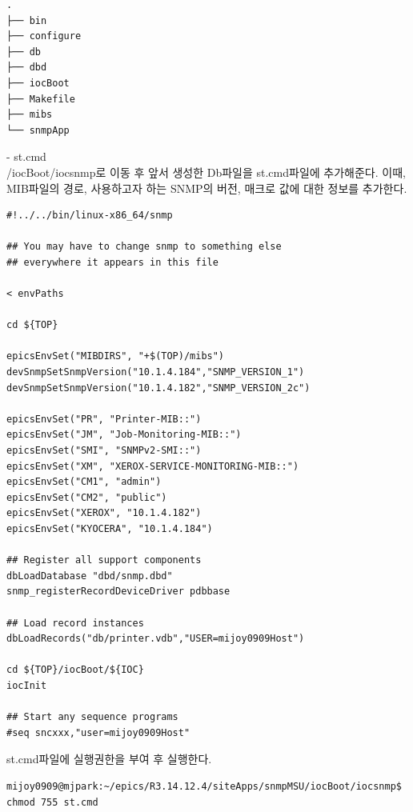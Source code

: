 \documentclass[11pt
  , a4paper
  , article
  , oneside
]{memoir}
\begin{document}
{\scriptsize
\begin{verbatim}
.
├── bin
├── configure
├── db
├── dbd
├── iocBoot
├── Makefile
├── mibs
└── snmpApp
\end{verbatim}
}




\hfill

-­ st.cmd\\
/iocBoot/iocsnmp로 이동 후 앞서 생성한 Db파일을 st.cmd파일에 추가해준다. 이때, MIB파일의 경로, 사용하고자 하는 SNMP의 버전, 매크로 값에 대한 정보를 추가한다. 





{\scriptsize
\begin{lstlisting}[style=termstyle]
#!../../bin/linux-x86_64/snmp

## You may have to change snmp to something else
## everywhere it appears in this file

< envPaths

cd ${TOP}

epicsEnvSet("MIBDIRS", "+$(TOP)/mibs")                     
devSnmpSetSnmpVersion("10.1.4.184","SNMP_VERSION_1")        
devSnmpSetSnmpVersion("10.1.4.182","SNMP_VERSION_2c")       

epicsEnvSet("PR", "Printer-MIB::")                           
epicsEnvSet("JM", "Job-Monitoring-MIB::")                     
epicsEnvSet("SMI", "SNMPv2-SMI::")
epicsEnvSet("XM", "XEROX-SERVICE-MONITORING-MIB::")        
epicsEnvSet("CM1", "admin")                               
epicsEnvSet("CM2", "public")
epicsEnvSet("XEROX", "10.1.4.182")
epicsEnvSet("KYOCERA", "10.1.4.184")                                           

## Register all support components
dbLoadDatabase "dbd/snmp.dbd"
snmp_registerRecordDeviceDriver pdbbase

## Load record instances
dbLoadRecords("db/printer.vdb","USER=mijoy0909Host")        

cd ${TOP}/iocBoot/${IOC}
iocInit

## Start any sequence programs
#seq sncxxx,"user=mijoy0909Host"
\end{lstlisting}
}


\hfill

st.cmd파일에 실행권한을 부여 후 실행한다. 
{\scriptsize
\begin{lstlisting}[style=termstyle]
mijoy0909@mjpark:~/epics/R3.14.12.4/siteApps/snmpMSU/iocBoot/iocsnmp$ chmod 755 st.cmd
\end{lstlisting}
}
\end{document}
